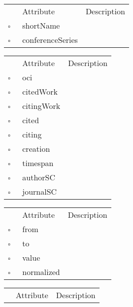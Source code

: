 \begin{table}
\caption{Proceedings  }

\begin{longtable}{llp{8cm}}
& Attribute & Description \\
$\square$\ & shortName &  \\
$\square$\ & conferenceSeries &  \\
\end{longtable}
\label{attr:Proceedings}
\end{table}

\begin{table}
\caption{Reference  }

\begin{longtable}{llp{8cm}}
& Attribute & Description \\
$\square$\ & oci &  \\
$\square$\ & citedWork &  \\
$\square$\ & citingWork &  \\
$\square$\ & cited &  \\
$\square$\ & citing &  \\
$\square$\ & creation &  \\
$\square$\ & timespan &  \\
$\square$\ & authorSC &  \\
$\square$\ & journalSC &  \\
\end{longtable}
\label{attr:Reference}
\end{table}

\clearpage
\begin{table}
\caption{ReferenceFlow  }

\begin{longtable}{llp{8cm}}
& Attribute & Description \\
$\square$\ & from &  \\
$\square$\ & to &  \\
$\square$\ & value &  \\
$\square$\ & normalized &  \\
\end{longtable}
\label{attr:ReferenceFlow}
\end{table}

\begin{table}
\caption{Scenario  This class describes the dataset for the application. Typically there is a single instance of this class in the application at all times.}

\begin{longtable}{llp{8cm}}
& Attribute & Description \\
\end{longtable}
\label{attr:Scenario}
\end{table}

